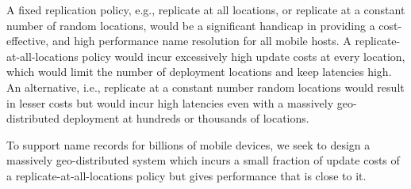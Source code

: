 A fixed replication policy, e.g., replicate at all locations, or replicate at a constant number of  random locations, would be a significant handicap in  providing  a cost-effective, and high performance name resolution for all mobile hosts. A replicate-at-all-locations policy would incur excessively high update costs at every location, which would limit the number of deployment locations and keep latencies high. An alternative, i.e., replicate at a constant number random locations would result in lesser costs but would incur high latencies even with a massively geo-distributed deployment at hundreds or thousands of locations.   

To support name records for billions of mobile devices, we seek to design a massively geo-distributed system which incurs a small fraction of update costs of a replicate-at-all-locations policy but gives performance that is close to it. 



